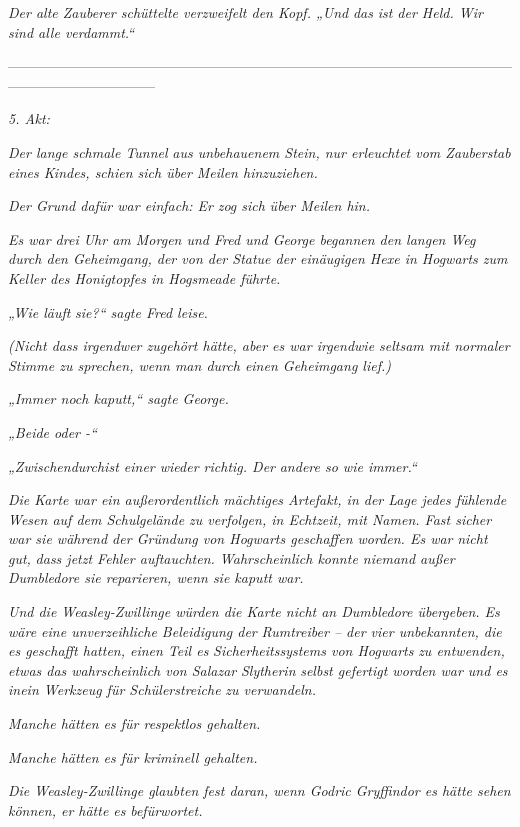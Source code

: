 {\emph{Der alte Zauberer schüttelte verzweifelt den Kopf. „Und} \emph{\emph{das}} \emph{ist der Held. Wir sind alle verdammt.“}

--------------------------------------------------------------------------------------------------------------------------------------------

\hfill\break \emph{5. Akt:}

\emph{Der lange schmale Tunnel} \emph{aus unbehauenem Stein, nur erleuchtet vom Zauberstab eines Kindes, schien sich über Meilen hinzuziehen.}

\emph{Der Grund dafür war einfach: Er} \emph{\emph{zog sich}} \emph{über Meilen hin.}

\emph{Es war drei Uhr am Morgen und Fred und George begannen den langen Weg durch den Geheimgang, der von der Statue der einäugigen Hexe in Hogwarts zum Keller des Honigtopfes in Hogsmeade führte.}

\emph{„Wie läuft} \emph{sie?“ sagte Fred leise.}

\emph{(Nicht dass irgendwer zugehört hätte, aber es war irgendwie seltsam mit normaler Stimme zu sprechen, wenn man durch einen Geheimgang lief.)}

\emph{„Immer noch kaputt,“ sagte George.}

\emph{„Beide oder -“}

\emph{„Zwischendurchist einer wieder richtig. Der} \emph{andere so wie immer.“}

\emph{Die Karte war ein außerordentlich mächtiges Artefakt, in der Lage jedes fühlende Wesen auf dem Schulgelände zu verfolgen, in Echtzeit, mit Namen. Fast sicher war sie während der Gründung von Hogwarts geschaffen worden. Es war} \emph{\emph{nicht gut,}} \emph{dass jetzt Fehler auftauchten. Wahrscheinlich konnte niemand außer Dumbledore sie reparieren, wenn sie kaputt war.}

\emph{Und die Weasley-Zwillinge würden die Karte nicht an Dumbledore übergeben. Es wäre eine unverzeihliche Beleidigung der} \emph{Rumtreiber -- der vier unbekannten, die es geschafft hatten, einen Teil es} \emph{\emph{Sicherheitssystems von Hogwarts}} \emph{zu entwenden, etwas das wahrscheinlich von Salazar} \emph{Slytherin} \emph{selbst gefertigt worden war und es} \emph{in\emph{ein Werkzeug für Schülerstreiche}} \emph{zu verwandeln.}

\emph{Manche hätten es für respektlos gehalten.}

\emph{Manche hätten es für kriminell gehalten.}

\emph{Die Weasley-Zwillinge glaubten fest daran, wenn Godric Gryffindor es hätte sehen können, er hätte es} \emph{befürwortet.}

}

